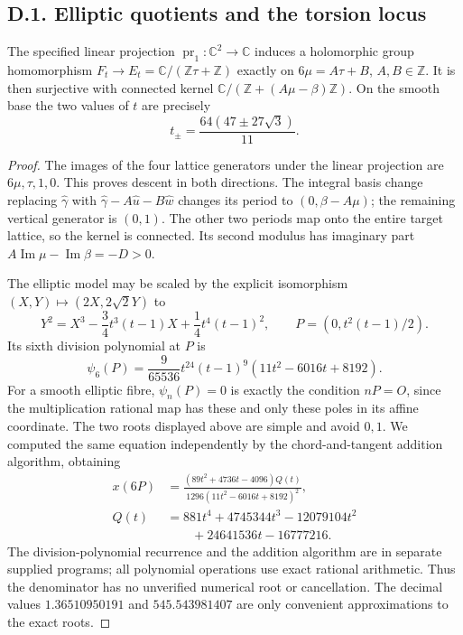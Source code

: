 \subsection{D.1. Elliptic quotients and the torsion locus}
\begin{proposition}\label{fam:src:D.1.1}\label{fam:st:D.1.1}
The specified linear projection \(\operatorname{pr}_1:\mathbb C^2\to
\mathbb C\) induces a holomorphic group homomorphism
\(F_t\to E_t=\mathbb C/(\mathbb Z\tau+\mathbb Z)\) exactly on
\(6\mu=A\tau+B\), \(A,B\in\mathbb Z\). It is then surjective with
connected kernel
\(\mathbb C/(\mathbb Z+(A\mu-\beta)\mathbb Z)\).
On the smooth base the two values of \(t\) are precisely
\[
 t_\pm=\frac{64(47\pm27\sqrt3)}{11}.
\]
\end{proposition}
\begin{proof}
The images of the four lattice generators under the linear projection
are \(6\mu,\tau,1,0\). This proves descent in both directions.
The integral basis change replacing \(\widehat\gamma\) with
\(\widehat\gamma-A\widehat u-B\widehat w\) changes its period to
\((0,\beta-A\mu)\); the remaining vertical generator is \((0,1)\).
The other two periods map onto the entire target lattice, so the kernel
is connected. Its second modulus has imaginary part
\(A\operatorname{Im}\mu-\operatorname{Im}\beta=-D>0\).

The elliptic model may be scaled by the explicit isomorphism
\((X,Y)\mapsto(2X,2\sqrt2Y)\) to
\[
 Y^2=X^3-\frac34t^3(t-1)X+\frac14t^4(t-1)^2,
 \qquad P=(0,t^2(t-1)/2).
\]
Its sixth division polynomial at \(P\) is
\[
 \psi_6(P)=\frac9{65536}t^{24}(t-1)^9
 (11t^2-6016t+8192).
\]
For a smooth elliptic fibre, \(\psi_n(P)=0\) is exactly the condition
\(nP=O\), since the multiplication rational map has these and only these
poles in its affine coordinate. The two roots displayed above are simple
and avoid \(0,1\). We computed the same equation independently by the
chord-and-tangent addition algorithm, obtaining
\[
 \begin{aligned}
 x(6P)&=\frac{(89t^2+4736t-4096)Q(t)}
 {1296(11t^2-6016t+8192)^2},\\
 Q(t)&=881t^4+4745344t^3-12079104t^2\\
 &\hspace{2em}+24641536t-16777216.
 \end{aligned}
\]
The division-polynomial recurrence and the addition algorithm are in
separate supplied programs; all polynomial operations use exact rational
arithmetic. Thus the denominator has no unverified numerical root or
cancellation. The decimal values \(1.36510950191\) and
\(545.543981407\) are only convenient approximations to the exact roots.
\end{proof}

